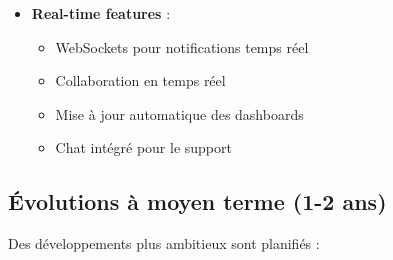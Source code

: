 \documentclass[12pt,a4paper]{report}
\begin{document}
\begin{itemize}
\item \textbf{Real-time features} : 
  \begin{itemize}
  \item WebSockets pour notifications temps réel
  \item Collaboration en temps réel
  \item Mise à jour automatique des dashboards
  \item Chat intégré pour le support
  \end{itemize}
\end{itemize}

\subsection{Évolutions à moyen terme (1-2 ans)}
Des développements plus ambitieux sont planifiés :
\end{document}
